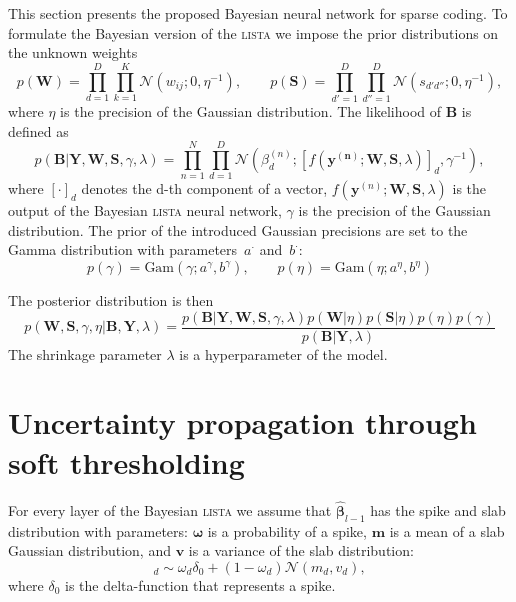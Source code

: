 \documentclass{article}
\begin{document}
This section presents the proposed Bayesian neural network for sparse coding. To formulate the Bayesian version of the \textsc{lista} we impose the prior distributions on the unknown weights
\begin{equation}
\label{eq:ws}
p(\mathbf{W}) = \prod_{d=1}^D\prod_{k=1}^K \mathcal{N}(w_{ij} ; 0, \eta^{-1}), \qquad
p(\mathbf{S}) = \prod_{d'=1}^D\prod_{d''=1}^D \mathcal{N}(s_{d'd''} ; 0, \eta^{-1}),
\end{equation}
where $\eta$ is the precision of the Gaussian distribution.
The likelihood of $\mathbf{B}$ is defined as
\begin{equation}
\label{eq:likelihood}
p(\mathbf{B}| \mathbf{Y}, \mathbf{W}, \mathbf{S}, \gamma, \lambda) = \prod_{n=1}^N\prod_{d=1}^D\mathcal{N}(\beta_d^{(n)}; [f(\mathbf{y^{(n)}}; \mathbf{W}, \mathbf{S}, \lambda)]_d, \gamma^{-1}),
\end{equation}
where $[\cdot]_d$ denotes the d-th component of a vector, $f(\mathbf{y}^{(n)}; \mathbf{W}, \mathbf{S}, \lambda)$ is the output of the Bayesian \textsc{lista} neural network, $\gamma$ is the precision of the Gaussian distribution.
The prior of the introduced Gaussian precisions are set to the Gamma distribution with parameters~$a^{\cdot}$ and~$b^{\cdot}$:
\begin{equation}
\label{eq:gamma_eta}
p(\gamma) = \text{Gam}\left(\gamma; a^{\gamma}, b^{\gamma}\right), \qquad
p(\eta) = \text{Gam}\left(\eta; 	a^{\eta}, b^{\eta}\right)
\end{equation}

The posterior distribution is then
\begin{equation}
\label{eq:posterior}
p(\mathbf{W}, \mathbf{S}, \gamma, \eta | \mathbf{B}, \mathbf{Y}, \lambda) = \frac{p(\mathbf{B} | \mathbf{Y}, \mathbf{W},  \mathbf{S}, \gamma, \lambda) p(\mathbf{W} | \eta )p(\mathbf{S} | \eta) p(\eta) p(\gamma)}{p(\mathbf{B} | \mathbf{Y}, \lambda)}
\end{equation}
The shrinkage parameter $\lambda$ is a hyperparameter of the model.

\section{Uncertainty propagation through soft thresholding}
\label{sec:fprop}
For every layer of the Bayesian \textsc{lista} we assume that $\widehat{\boldsymbol\beta}_{l-1}$ has the spike and slab distribution with parameters: $\boldsymbol\omega$ is a probability of a spike, $\mathbf{m}$ is a mean of a slab Gaussian distribution, and $\mathbf{v}$ is a variance of the slab distribution:
\begin{equation}
[\widehat{\boldsymbol\beta}_{l-1}]_d \sim \omega_d \delta_0 + (1 - \omega_d)\mathcal{N}(m_d, v_d),
\end{equation}
where $\delta_0$ is the delta-function that represents a spike.
\end{document}
